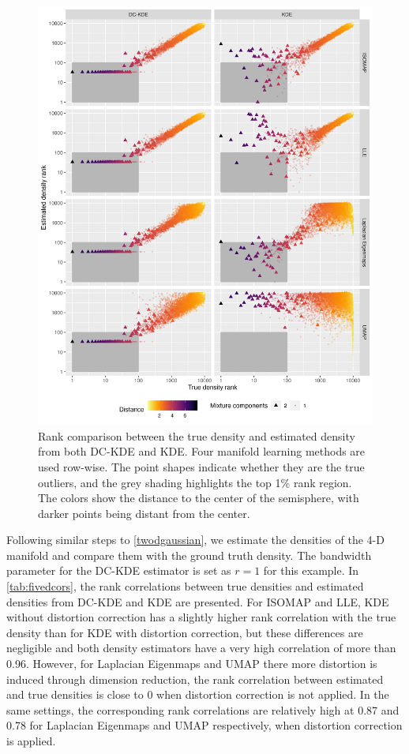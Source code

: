 \documentclass[11pt,a4paper,]{article}
\begin{document}
\begin{figure}

{\centering \includegraphics[width=0.95\linewidth]{figures/sim4d10000_density_comparison_4ml_radius10_k200_rankdensity_circleoutlier_with1rec} 

}

\caption{Rank comparison between the true density and estimated density from both DC-KDE and KDE. Four manifold learning methods are used row-wise. The point shapes indicate whether they are the true outliers, and the grey shading highlights the top 1\% rank region. The colors show the distance to the center of the semisphere, with darker points being distant from the center.}\label{fig:fivedisomapden}
\end{figure}

Following similar steps to \autoref{twodgaussian}, we estimate the densities of the 4-D manifold and compare them with the ground truth density. The bandwidth parameter for the DC-KDE estimator is set as \(r=1\) for this example. In \autoref{tab:fivedcors}, the rank correlations between true densities and estimated densities from DC-KDE and KDE are presented. For ISOMAP and LLE, KDE without distortion correction has a slightly higher rank correlation with the true density than for KDE with distortion correction, but these differences are negligible and both density estimators have a very high correlation of more than 0.96. However, for Laplacian Eigenmaps and UMAP there more distortion is induced through dimension reduction, the rank correlation between estimated and true densities is close to 0 when distortion correction is not applied. In the same settings, the corresponding rank correlations are relatively high at 0.87 and 0.78 for Laplacian Eigenmaps and UMAP respectively, when distortion correction is applied.
\end{document}
